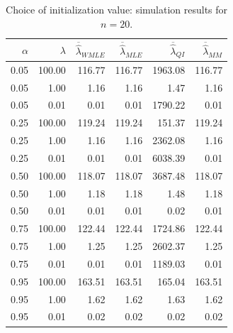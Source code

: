 \begin{appendices}
\begin{table}[ht] 
\centering
\begin{tabular}{|rr||rrrr|}
 \hline
 $\alpha$ & $\lambda$ & $\overline{\hat\lambda}_{WMLE}$ & $\overline{\hat\lambda}_{MLE}$ & $\overline{\hat\lambda}_{QI}$ & $\overline{\hat\lambda}_{MM}$ \\
  \hline
  \hline
 0.05 & 100.00 & 116.77 & 116.77 & 1963.08 & 116.77 \\ 
   0.05 & 1.00 & 1.16 & 1.16 & 1.47 & 1.16 \\ 
   0.05 & 0.01 & 0.01 & 0.01 & 1790.22 & 0.01 \\ 
   0.25 & 100.00 & 119.24 & 119.24 & 151.37 & 119.24 \\ 
   0.25 & 1.00 & 1.16 & 1.16 & 2362.08 & 1.16 \\ 
   0.25 & 0.01 & 0.01 & 0.01 & 6038.39 & 0.01 \\ 
   0.50 & 100.00 & 118.07 & 118.07 & 3687.48 & 118.07 \\ 
   0.50 & 1.00 & 1.18 & 1.18 & 1.48 & 1.18 \\ 
   0.50 & 0.01 & 0.01 & 0.01 & 0.02 & 0.01 \\ 
   0.75 & 100.00 & 122.44 & 122.44 & 1724.86 & 122.44 \\ 
   0.75 & 1.00 & 1.25 & 1.25 & 2602.37 & 1.25 \\ 
   0.75 & 0.01 & 0.01 & 0.01 & 1189.03 & 0.01 \\ 
   0.95 & 100.00 & 163.51 & 163.51 & 165.04 & 163.51 \\ 
   0.95 & 1.00 & 1.62 & 1.62 & 1.63 & 1.62 \\ 
   0.95 & 0.01 & 0.02 & 0.02 & 0.02 & 0.02 \\ 
   \hline
\end{tabular}
\caption{Choice of initialization value: simulation results for $n = 20$.}\label{tab:sim:init1}
\end{table}


\end{appendices}
